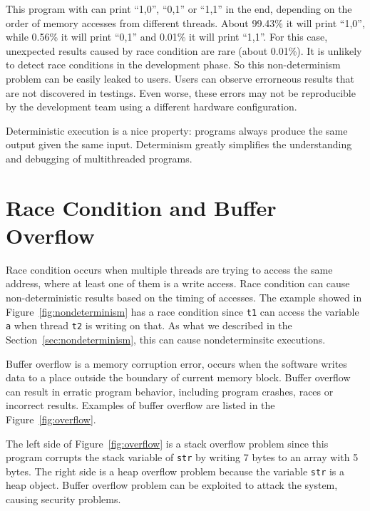 \label{sec:nondeterminism}
This program with \pthreads{} can print ``1,0'', ``0,1'' or ``1,1'' in the end, 
depending on the order of memory accesses from different threads. 
About 99.43\% it will print ``1,0'', while 0.56\% it will print ``0,1''
and 0.01\% it will print ``1,1''.
For this case, unexpected results caused by race condition are rare (about 0.01\%). 
It is unlikely to detect race conditions in the development phase. 
So this non-determinism problem can be easily leaked to users.
Users can observe errorneous results that are not discovered in testings. 
Even worse, these errors may not be reproducible by the development team using
a different hardware configuration. 

Deterministic execution is a nice property: programs always produce 
the same output given the same input.
Determinism greatly simplifies the understanding and debugging of multithreaded programs.

\section{Race Condition and Buffer Overflow}
Race condition occurs when multiple threads are trying to access the same address, 
where at least one of them is a write access.
Race condition can cause non-deterministic results based on 
the timing of accesses.
The example showed in Figure~\ref{fig:nondeterminism} has a race condition since \texttt{t1} 
can access the variable \texttt{a} when thread \texttt{t2} is writing on that. As what we described 
in the Section~\ref{sec:nondeterminism}, this can cause nondeterminsitc executions.

Buffer overflow is a memory corruption error, occurs when the software writes data to a place outside
the boundary of current memory block.
Buffer overflow can result in erratic program behavior, including program 
crashes, races or incorrect results. 
Examples of buffer overflow are listed in the Figure~\ref{fig:overflow}.

\begin{figure*}[!ht]
{\centering
\fbox{
\subfigure{}
\hspace{12pt}
\subfigure{}
}
\caption{Buffer overflow problems 
\label{fig:overflow}}
}
\end{figure*}

The left side of Figure~\ref{fig:overflow} is a stack overflow problem since this program corrupts 
the stack variable of \texttt{str} by writing 7 bytes to an array with 5 bytes.
The right side is a heap overflow problem because the variable \texttt{str} is a heap object. 
Buffer overflow problem can be exploited to attack the system, causing security problems.

